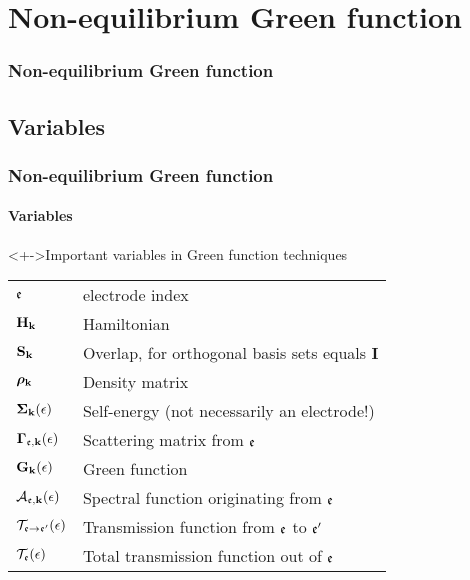 \section{Non-equilibrium Green function}

\begin{framenologo}
  \frametitle{Non-equilibrium Green function}
  \tableofcontents[currentsection]
\end{framenologo}

\subsection{Variables}

\begin{frame}
  \frametitle{Non-equilibrium Green function}
  \framesubtitle{Variables}

  \begin{block}<+->{Important variables in Green function techniques}
    
    \begin{tabular}[c]{>{$}l<{$}|l}
      \idxE & electrode index
      \\
      \HH_\kk & Hamiltonian
      \\
      \SO_\kk & Overlap, for orthogonal basis sets equals $\mathbf I$
      \\
      \DM_\kk & Density matrix
      \\
      \SE_\kk(\E)& Self-energy (not necessarily an electrode!)
      \\
      \Scat_{\idxE,\kk}(\E) & Scattering matrix from $\idxE$
      \\
      \G_\kk(\E) & Green function
      \\
      \Spec_{\idxE,\kk}(\E) & Spectral function originating from $\idxE$
      \\
      \T_{\idxE\mto\idxE'}(\E) & Transmission function from $\idxE$ to $\idxE'$
      \\
      \T_\idxE(\E) & Total transmission function out of $\idxE$
    \end{tabular}

  \end{block}
  

\end{frame}


